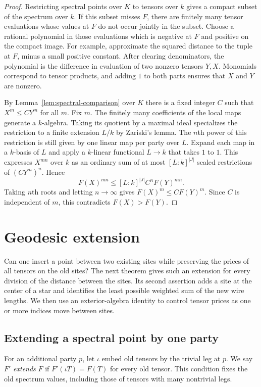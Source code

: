 \begin{proof}
Restricting spectral points over $K$ to tensors over $k$ gives a compact
subset of the spectrum over $k$. If this subset misses $F$, there are
finitely many tensor evaluations whose values at $F$ do not occur
jointly in the subset. Choose a rational polynomial in those evaluations
which is negative at $F$ and positive on the compact image. For example,
approximate the squared distance to the tuple at $F$, minus a small
positive constant. After clearing denominators, the polynomial is the
difference in evaluation of two nonzero tensors $Y,X$. Monomials
correspond to tensor products, and adding $1$ to both parts ensures
that $X$ and $Y$ are nonzero.

By Lemma~\ref{lem:spectral-comparison} over $K$ there is a fixed integer
$C$ such that $X^m\le C Y^m$ for all $m$. Fix $m$. The finitely many
coefficients of the local maps generate a $k$-algebra. Taking its
quotient by a maximal ideal specializes the restriction to a finite
extension $L/k$ by Zariski's lemma. The $n$th power of this restriction
is still given by one linear map per party over $L$. Expand each map
in a $k$-basis of $L$ and apply a $k$-linear functional $L\to k$ that
takes $1$ to $1$. This expresses $X^{mn}$ over $k$ as an ordinary sum
of at most $[L:k]^{|J|}$ scaled restrictions of $(CY^m)^n$. Hence
\[
              F(X)^{mn}\le [L:k]^{|J|} C^nF(Y)^{mn}.
\]
Taking $n$th roots and letting $n\to\infty$ gives
$F(X)^m\le C F(Y)^m$. Since $C$ is independent of $m$, this contradicts
$F(X)>F(Y)$.
\end{proof}
\section{Geodesic extension}
\label{sec:geodesic}
Can one insert a point between two existing sites while preserving the
prices of all tensors on the old sites? The next theorem gives such an
extension for every division of the distance between the sites. Its
second assertion adds a site at the center of a star and identifies the
least possible weighted sum of the new wire lengths. We then use an
exterior-algebra identity to control tensor prices as one or more
indices move between sites.
\subsection{Extending a spectral point by one party}

For an additional party $p$, let $\iota$ embed old tensors by the
trivial leg at $p$. We say $F'$ \emph{extends} $F$ if
$F'(\iota T)=F(T)$ for every old tensor. This condition fixes the
old spectrum values, including those of tensors with many
nontrivial legs.

